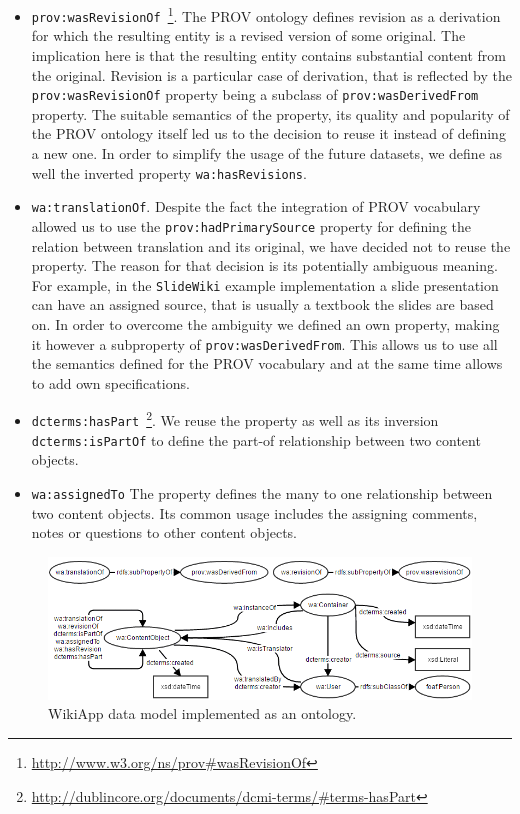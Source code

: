 \documentclass[PhD, Submit, ngerman,UKenglish,table]{scrbook}
\begin{document}
\begin{itemize}
\item \verb|prov:wasRevisionOf|~\footnote{\url{http://www.w3.org/ns/prov\#wasRevisionOf}}.
The PROV ontology defines revision as a derivation for which the resulting entity is a revised version of some original.
The implication here is that the resulting entity contains substantial content from the original.
Revision is a particular case of derivation, that is reflected by the \verb|prov:wasRevisionOf| property being a subclass of \verb|prov:wasDerivedFrom| property.
The suitable semantics of the property, its quality and popularity of the PROV ontology itself led us to the decision to reuse it instead of defining a new one.
In order to simplify the usage of the future datasets, we define as well the inverted property \verb|wa:hasRevisions|.

\item \verb|wa:translationOf|. 
Despite the fact the integration of PROV vocabulary allowed us to use the \verb|prov:hadPrimarySource| property for defining the relation between translation and its original, we have decided not to reuse the property.
The reason for that decision is its potentially ambiguous meaning.
For example, in the \texttt{SlideWiki} example implementation a slide presentation can have an assigned source, that is usually a textbook the slides are based on.
In order to overcome the ambiguity we defined an own property, making it however a subproperty of \verb|prov:wasDerivedFrom|. 
This allows us to use all the semantics defined for the PROV vocabulary and at the same time allows to add own specifications.
\item \verb|dcterms:hasPart|~\footnote{\url{http://dublincore.org/documents/dcmi-terms/\#terms-hasPart}}.
We reuse the property as well as its inversion \verb|dcterms:isPartOf| to define the part-of relationship between two content objects.

\item \verb|wa:assignedTo|
The property defines the many to one relationship between two content objects.
Its common usage includes the assigning comments, notes or questions to other content objects.
\end{itemize}
  

\begin{figure}[htb]
	\centering
		\includegraphics[width=\columnwidth]{images/wa_ontology_new.png}
	\caption{WikiApp data model implemented as an ontology.}
	\label{fig:wa_ontology}
\end{figure}
\end{document}
